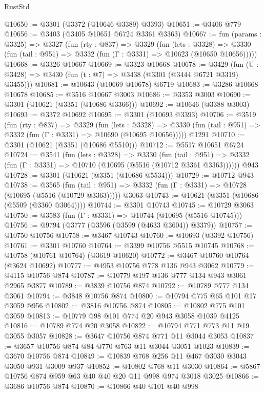 \begin{lexlean}{RustStd}
\begin{coremodule}
@10650 := @3301 (@3372 (@10646 @3389) @3393)
@10651 := @3406 @779
@10656 := @3403 (@3405 @10651 @6724 @3361 @3363)
@10667 := fun (params : @3325) =>
  @3327
    (fun (rty : @837) =>
    @3329
      (fun (lets : @3328) =>
      @3330 (fun (tail : @951) => @3332 (fun (Γ : @3331) => @10623 (@10650 @10656)))))
@10668 := @3326 @10667
@10669 := @3323 @10668
@10678 := @3429 (fun (U : @3428) => @3430 (fun (t : @7) => @3438 (@3301 (@3444 @6721 @3319) @3455)))
@10681 := @10643 (@10669 @10678) @6719
@10683 := @3286 @10668 @10678
@10685 := @3516 @10667 @3003
@10686 := @3353 @3003
@10690 := @3301 (@10621 (@3351 (@10686 @3366)))
@10692 := @10646 (@3388 @3003)
@10693 := @3372 @10692
@10695 := @3301 (@10693 @3393)
@10706 := @3519
    (fun (rty : @837) =>
    @3329
      (fun (lets : @3328) =>
      @3330 (fun (tail : @951) => @3332 (fun (Γ : @3331) => @10690 (@10695 @10656)))))
    @1291
@10710 := @3301 (@10621 (@3351 (@10686 @5510)))
@10712 := @5517 @10651 @6724
@10724 := @3541
    (fun (lets : @3328) =>
    @3330
      (fun (tail : @951) =>
      @3332 (fun (Γ : @3331) => @10710 (@10695 (@5516 (@10712 @3361 @3363))))))
    @943
@10728 := @3301 (@10621 (@3351 (@10686 @5534)))
@10729 := @10712 @943
@10738 := @3565
    (fun (tail : @951) => @3332 (fun (Γ : @3331) => @10728 (@10695 (@5516 (@10729 @3363)))))
    @3063
@10743 := @10621 (@3351 (@10686 (@5509 (@3360 @3064))))
@10744 := @3301 @10743
@10745 := @10729 @3063
@10750 := @3583 (fun (Γ : @3331) => @10744 (@10695 (@5516 @10745)))
@10756 := @9794 (@3777 (@3596 (@3599 (@4633 @3604)) @3379))
@10757 := @10750 @10756
@10758 := @3467 @10743
@10760 := @10693 (@3392 @10756)
@10761 := @3301 @10760
@10764 := @3399 @10756 @5515 @10745
@10768 := @10758 (@10761 @10764) (@3619 @10620)
@10772 := @3467 @10760 @10764 (@3624 @10692)
@10777 := @4953 @10756 @778 @136 @943 @3062
@10779 := @4115 @10756 @874
@10787 := @10779 @197 @136 @777 @134 @943 @3061 @2965 @3877
@10789 := @3839 @10756 @874
@10792 := @10789 @777 @134 @3061
@10794 := @3848 @10756 @874
@10800 := @10794 @775 @65 @101 @17 @3059 @956
@10802 := @3816 @10756 @874
@10805 := @10802 @775 @101 @3059
@10813 := @10779 @98 @101 @774 @20 @943 @3058 @1039 @4125
@10816 := @10789 @774 @20 @3058
@10822 := @10794 @771 @773 @11 @19 @3055 @3057
@10828 := @3647 @10756 @874 @771 @11 @3044 @3053
@10837 := @3657 @10756 @874 @84 @770 @763 @11 @3044 @3051 @1023
@10839 := @3670 @10756 @874
@10849 := @10839 @768 @256 @11 @467 @3030 @3043 @3050 @931 @3009 @937
@10852 := @10802 @768 @11 @3030
@10864 := @5867 @10756 @874 @959 @63 @40 @40 @20 @11 @998 @974 @3018 @3025
@10866 := @3686 @10756 @874
@10870 := @10866 @40 @101 @40 @998

\end{coremodule}
\end{lexlean}
